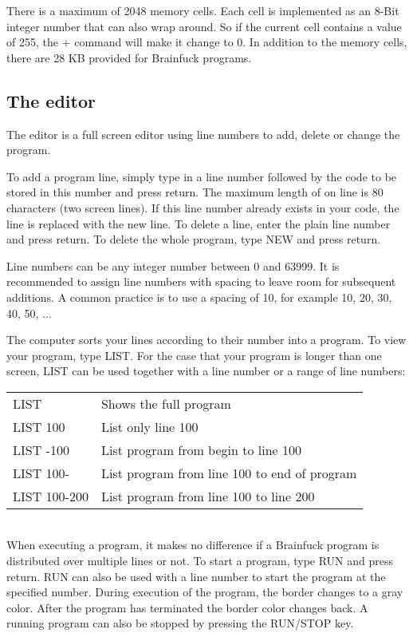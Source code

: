 \documentclass[ms,article,a4paper]{memoir}
\begin{document}
There is a maximum of 2048 memory cells. Each cell is implemented as an 8-Bit integer number that can also wrap around. So if the current cell contains a value of 255, the + command will make it change to 0. In addition to the memory cells, there are 28 KB provided for Brainfuck programs.

\subsection{The editor}

The editor is a full screen editor using line numbers to add, delete or change the program. 

To add a program line, simply type in a line number followed by the code to be stored in this number and press return. The maximum length of on line is 80 characters (two screen lines). If this line number already exists in your code, the line is replaced with the new line. To delete a line, enter the plain line number and press return. To delete the whole program, type NEW and press return.

Line numbers can be any integer number between 0 and 63999. It is recommended to assign line numbers with spacing to leave room for subsequent additions. A common practice is to use a spacing of 10, for example 10, 20, 30, 40, 50, ...

The computer sorts your lines according to their number into a program.
To view your program, type LIST. For the case that your program is longer than one screen, LIST can be used together with a line number or a range of line numbers:\\

\begin{tabular}{ l l }
LIST & Shows the full program\\
LIST 100 & List only line 100\\
LIST -100 & List program from begin to line 100\\
LIST 100- & List program from line 100 to end of program\\
LIST 100-200 & List program from line 100 to line 200\\
\end{tabular}
\\

When executing a program, it makes no difference if a Brainfuck program is distributed over multiple lines or not. To start a program, type RUN and press return. RUN can also be used with a line number to start the program at the specified number. During execution of the program, the border changes to a gray color. After the program has terminated the border color changes back. A running program can also be stopped by pressing the RUN/STOP key.
\end{document}
